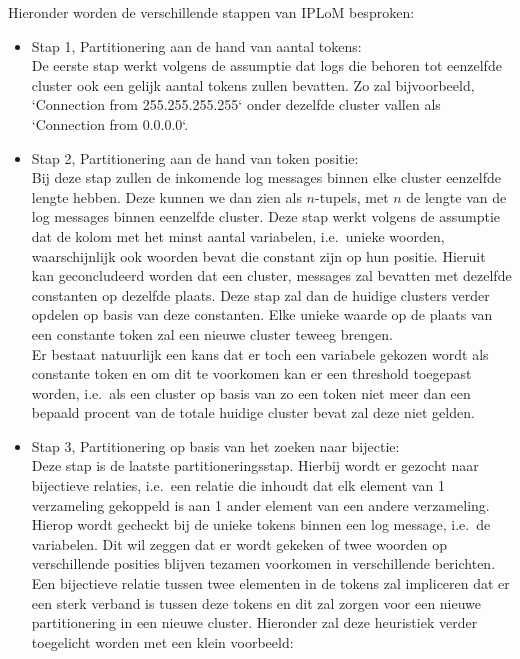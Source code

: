 Hieronder worden de verschillende stappen van IPLoM besproken: 
\begin{itemize}
    \item Stap 1, Partitionering aan de hand van aantal tokens:\\
    De eerste stap werkt volgens de assumptie dat logs die behoren tot eenzelfde cluster ook een gelijk aantal tokens zullen bevatten. Zo zal bijvoorbeeld, `Connection from 255.255.255.255` onder dezelfde cluster vallen als `Connection from 0.0.0.0`.\\
    
    \item Stap 2, Partitionering aan de hand van token positie:\\
    Bij deze stap zullen de inkomende log messages binnen elke cluster eenzelfde lengte hebben. Deze kunnen we dan zien als $n$-tupels, met $n$ de lengte van de log messages binnen eenzelfde cluster. Deze stap werkt volgens de assumptie dat de kolom met het minst aantal variabelen, i.e.\ unieke woorden, waarschijnlijk ook woorden bevat die constant zijn op hun positie. Hieruit kan geconcludeerd worden dat een cluster, messages zal bevatten met dezelfde constanten op dezelfde plaats. Deze stap zal dan de huidige clusters verder opdelen op basis van deze constanten. Elke unieke waarde op de plaats van een constante token zal een nieuwe cluster teweeg brengen.\\
    
    Er bestaat natuurlijk een kans dat er toch een variabele gekozen wordt als constante token en om dit te voorkomen kan er een threshold toegepast worden, i.e.\ als een cluster op basis van zo een token niet meer dan een bepaald procent van de totale huidige cluster bevat zal deze niet gelden.\\
    
    \item Stap 3, Partitionering op basis van het zoeken naar bijectie:\\
    
    Deze stap is de laatste partitioneringsstap. Hierbij wordt er gezocht naar bijectieve relaties, i.e.\ een relatie die inhoudt dat elk element van 1 verzameling gekoppeld is aan 1 ander element van een andere verzameling. Hierop wordt gecheckt bij de unieke tokens binnen een log message, i.e.\ de variabelen. Dit wil zeggen dat er wordt gekeken of twee woorden op verschillende posities blijven tezamen voorkomen in verschillende berichten. Een bijectieve relatie tussen twee elementen in de tokens zal impliceren dat er een sterk verband is tussen deze tokens en dit zal zorgen voor een nieuwe partitionering in een nieuwe cluster. Hieronder zal deze heuristiek verder toegelicht worden met een klein voorbeeld:\\
    

\end{itemize}
